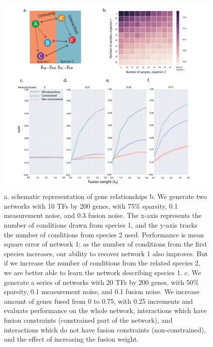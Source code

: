 \documentclass[11pt]{article}
\begin{document}
\begin{figure}
\begin{center}
  \includegraphics[scale=0.45]{fig1.pdf}
  \caption{\label{fusion} a. schematic representation of gene relationships b. We generate two networks with 10 TFs by 200 genes, with 75\% sparsity, 0.1 measurement noise, and 0.3 fusion noise. The x-axis represents the number of conditions drawn from species 1, and the y-axis tracks the number of conditions from species 2 used. Performance is mean square error of network 1; as the number of conditions from the first species increases, our ability to recover network 1 also improves. But if we increase the number of conditions from the related species 2, we are better able to learn the network describing species 1. c. We generate a series of networks with 20 TFs by 200 genes, with 50\% sparsity, 0.1 measurement noise, and 0.1 fusion noise. We increase amount of genes fused from 0 to 0.75, with 0.25 increments and evaluate performance on the whole network, interactions which have fusion constraints (constrained part of the network), and interactions which do not have fusion constraints (non-constrained), and the effect of increasing the fusion weight.}
\end{center}
\end{figure}
\end{document}
